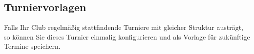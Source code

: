 \subsection{Turniervorlagen}

\noindent
Falls Ihr Club regelmäßig stattfindende Turniere mit gleicher Struktur austrägt,
so können Sie dieses Turnier einmalig konfigurieren und als Vorlage für
zukünftige Termine speichern.
